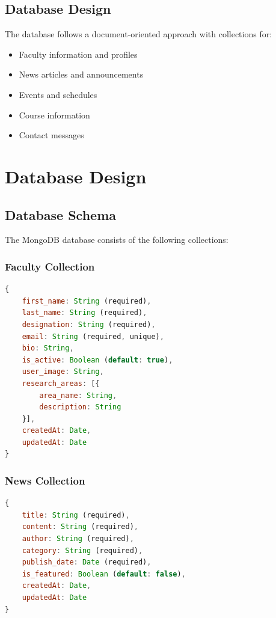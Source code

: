 \documentclass[12pt,a4paper]{report}
\begin{document}
\section{Database Design}
The database follows a document-oriented approach with collections for:
\begin{itemize}
    \item Faculty information and profiles
    \item News articles and announcements
    \item Events and schedules
    \item Course information
    \item Contact messages
\end{itemize}

\chapter{Database Design}
\label{chap:database}

\section{Database Schema}
The MongoDB database consists of the following collections:

\subsection{Faculty Collection}
\begin{lstlisting}[language=JavaScript, caption=Faculty Schema]
{
    first_name: String (required),
    last_name: String (required),
    designation: String (required),
    email: String (required, unique),
    bio: String,
    is_active: Boolean (default: true),
    user_image: String,
    research_areas: [{
        area_name: String,
        description: String
    }],
    createdAt: Date,
    updatedAt: Date
}
\end{lstlisting}

\subsection{News Collection}
\begin{lstlisting}[language=JavaScript, caption=News Schema]
{
    title: String (required),
    content: String (required),
    author: String (required),
    category: String (required),
    publish_date: Date (required),
    is_featured: Boolean (default: false),
    createdAt: Date,
    updatedAt: Date
}
\end{lstlisting}
\end{document}
